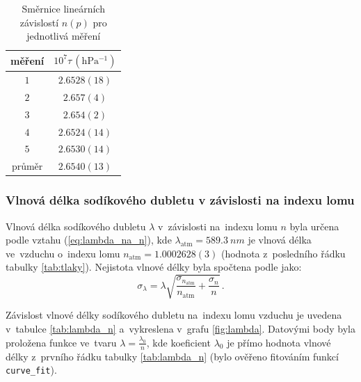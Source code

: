 \documentclass{../concepts/titul_zprava_p/prepareprotokolZprava} %
\newcommand{\relative}[1]{
\frac{\sigma_{#1}}{#1}
}
\begin{document}
\begin{table}[!htbp]
\centering
\caption{Směrnice lineárních závislostí $n(p)$ pro jednotlivá měření}
\begin{tabular}{cc}
 \toprule
 měření & $10^7\tau\, (\mathrm{hPa^{-1}})$ \\
 \midrule
 $1$ & $2.6528(18)$ \\
 $2$ & $2.657(4)$ \\
 $3$ & $2.654(2)$ \\
 $4$ & $2.6524(14)$ \\
 $5$ & $2.6530(14)$ \\
 \midrule
 průměr & $2.6540(13)$ \\
 \bottomrule
\end{tabular}
\label{tab:tau}
\end{table}

\subsubsection{Vlnová délka sodíkového dubletu v závislosti na indexu lomu}

Vlnová délka sodíkového dubletu $\lambda$ v~závislosti na~indexu lomu $n$ byla určena podle vztahu (\ref{eq:lambda_na_n}),
kde $\lambda_\mathrm{atm} = \qty{589.3}{nm}$ je vlnová délka ve~vzduchu o~indexu lomu $n_\mathrm{atm}=1.0002628(3)$
(hodnota z~posledního řádku tabulky \ref{tab:tlaky}). 
Nejistota vlnové délky byla spočtena podle \cite{englich} jako:
\begin{equation}
    \label{eq:sigma_lambda}
    \sigma_\lambda = \lambda \sqrt{ \relative{n_\mathrm{atm}} + \relative{n}} \,.
\end{equation}

Závislost vlnové délky sodíkového dubletu na~indexu lomu vzduchu je uvedena v~tabulce \ref{tab:lambda_n} a~vykreslena 
v~grafu \ref{fig:lambda}. Datovými body byla proložena funkce ve~tvaru $\lambda = \frac{\lambda_0}{n}$, kde
koeficient $\lambda_0$ je přímo hodnota vlnové délky z~prvního řádku tabulky \ref{tab:lambda_n} (bylo ověřeno fitováním
funkcí \texttt{curve\_fit}).
\end{document}
